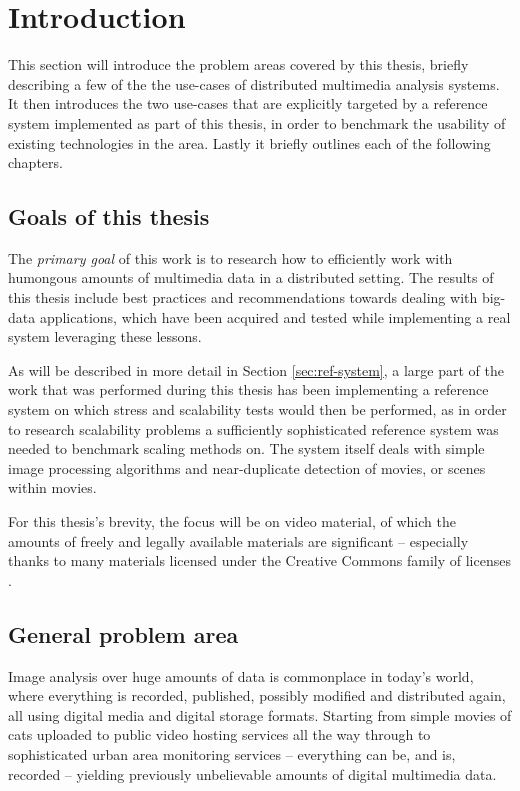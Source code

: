 \chapter{Introduction}
\label{cha:intro}

This section will introduce the problem areas covered by this thesis, briefly describing a few of the the use-cases of distributed multimedia analysis systems. It then introduces the two use-cases that are explicitly targeted by a reference system implemented as part of this thesis, in order to benchmark the usability of existing technologies in the area. Lastly it briefly outlines each of the following chapters.


\section{Goals of this thesis}
The \textit{primary goal} of this work is to research how to efficiently work with humongous amounts of multimedia data in a distributed setting. The results of this thesis include best practices and recommendations towards dealing with big-data applications, which have been acquired and tested while implementing a real system leveraging these lessons. 

As will be described in more detail in Section \ref{sec:ref-system}, a large part of the work that was performed during this thesis has been implementing a reference system on which stress and scalability tests would then be performed, as in order to research scalability problems a sufficiently sophisticated reference system was needed to benchmark scaling methods on. The system itself deals with simple image processing algorithms and near-duplicate detection of movies, or scenes within movies.

For this thesis's brevity, the focus will be on video material, of which the amounts of freely and legally  available materials are significant -- especially thanks to many materials licensed under the Creative Commons family of licenses \cite{creative-commons}.


\section{General problem area}
Image analysis over huge amounts of data is commonplace in today's world, where everything is recorded, published, possibly modified and distributed again, all using digital media and digital storage formats. Starting from simple movies of cats uploaded to public video hosting services all the way through to sophisticated urban area monitoring services -- everything can be, and is, recorded -- yielding previously unbelievable amounts of digital multimedia data.

